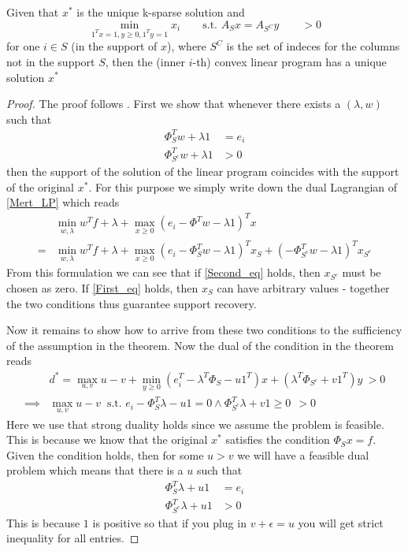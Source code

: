 \documentclass{article} %
\begin{document}
\begin{lemma} \label{thm:linftyunique}
Given that $x^*$ is the unique k-sparse solution and
\begin{equation*}
\min_{1^Tx = 1, y\geq 0, 1^Ty =1} x_i \qquad \text{s.t. } A_S x = A_{S^C} y \qquad>0
\end{equation*}
for one $i \in S$ (in the support of $x$), where $S^C$ is the set of indeces for the columns not in the support $S$, then the (inner $i$-th) convex linear program has a unique solution $x^*$
\end{lemma}
\begin{proof}
The proof follows \cite{mert}.
First we show that whenever there exists a $(\lambda, w)$ such that
\begin{align}
\Phi^T_{S}w + \lambda 1 &= e_i \label{First_eq}\\
\Phi^T_{S^c}w + \lambda 1 &>0 \label{Second_eq}
\end{align}
then the support of the solution of the linear program coincides with the support of the original $x^*$. For this purpose we simply write down the dual Lagrangian of \eqref{Mert_LP} which reads
\begin{align*}
&\min_{w,\lambda} w^Tf + \lambda +  \max_{x\geq 0} (e_i- \Phi^Tw - \lambda 1)^T x\\
= &\min_{w,\lambda} w^Tf + \lambda + \max_{x\geq 0} (e_i- \Phi_S^Tw - \lambda 1)^T x_S + (- \Phi_{S^c}^Tw - \lambda 1)^T x_{S^c}
\end{align*}
From this formulation we can see that if \eqref{Second_eq} holds, then $x_{S^c}$ must be chosen as zero. If \eqref{First_eq} holds, then $x_S$ can have arbitrary values - together the two conditions thus guarantee support recovery. 

Now it remains to show how to arrive from these two conditions to the sufficiency of the assumption in the theorem. Now the dual of the condition in the theorem reads
\begin{align*}
&d^* = \max_{u,v} u -v +\min_{y\geq 0} (e_i^T - \lambda^T\Phi_S - u1^T) x + (\lambda^T \Phi_{S^c} + v1^T) y\: >0\\
\implies &\max_{u,v} u-v \:  \text{ s.t. } e_i - \Phi_S^T \lambda - u1 = 0 \wedge \Phi_{S^c}^T \lambda + v1\geq 0 \:\: >0
\end{align*}
Here we use that strong duality holds since we assume the problem is feasible. This is because we know that the original $x^*$ satisfies the condition $\Phi_S x = f$. 
Given the condition holds, then for some $u>v$ we will have a feasible dual problem which means that there is a $u$ such that 
\begin{align*}
 \Phi_S^T \lambda +u1 &= e_i\\
\Phi_{S^c}^T \lambda + u1 &> 0 
\end{align*}
This is because $1$ is positive so that if you plug in $v+\epsilon = u$ you will get strict inequality for all entries. 
\end{proof}
\end{document}
